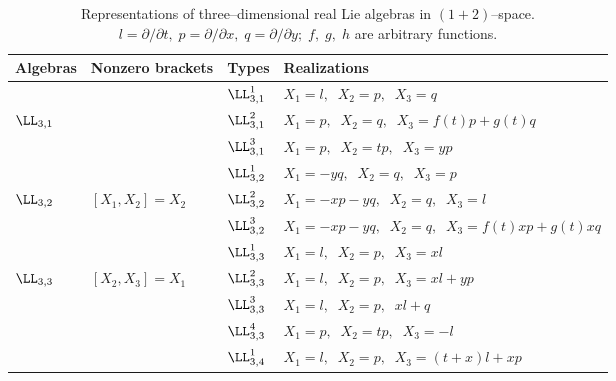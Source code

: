 %

\begin{table}
\begin{center}
\label{t1}
\caption{Representations of three--dimensional real Lie algebras
in $(1+2)$--space. {\protect \\}
$l=\partial /\partial t,\;p=\partial /\partial x,\;
          q=\partial /\partial y;\;f,\;g,\;h $  
are arbitrary functions.}
\begin{tabular}{|l|l|l|l|}
\hline
Algebras & Nonzero brackets & Types & Realizations\\
\hline
    &       & $\LL_{3,1}^1$  & $X_1=l,\;\;X_2=p,\;\;X_3=q$\\
\cline{3-4}
$\LL_{3,1} $ &  & $\LL_{3,1}^2$ & $X_1=p,\;\;X_2=q,\;\;
                                          X_3=f(t)p+g(t)q$\\
\cline{3-4}
    &     & $\LL_{3,1}^3$ & $ X_1=p,\;\;X_2=tp,\;\; X_3=yp$\\
\hline
   &   & $\LL_{3,2}^1$ & $X_1=-yq,\;\;X_2=q,\;\;X_3=p$\\
\cline{3-4}
$\LL_{3,2}$ & $[X_1,X_2]=X_2$ & $\LL_{3,2}^2$&
$X_1=-xp-yq,\;\;X_2=q,\;\;X_3=l$\\
\cline{3-4}
  &   &  $\LL_{3,2}^3$ & $ X_1=-xp-yq,\;\;X_2=q,\;\;X_3=f(t)xp+g(t)xq$\\
\hline
   &  & $\LL_{3,3}^1$ & $X_1=l,\;\; X_2=p,\;\; X_3=xl$\\
\cline{3-4}
$ \LL_{3,3}$ & $[X_2,X_3]=X_1 $ & $\LL_{3,3}^2$& $X_1=l,\;\;
                                    X_2=p,\;\;X_3=xl+yp$\\
\cline{3-4}
 &  & $\LL_{3,3}^3$ & $ X_1=l,\;\;X_2=p,\;\;xl+q$\\  
 \cline{3-4}
 &  & $\LL_{3,3}^4$ & $ X_1=p,\;\;X_2=tp,\;\;X_3=-l$\\
\hline
  &  & $\LL_{3,4}^1$ & $X_1=l,\;\;X_2=p,\;\;X_3=(t+x)l+xp$\\

\end{tabular}
\end{center}
\end{table}
